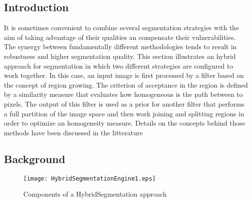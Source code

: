 %
%
% 
%
%
%

\subsection{Introduction}
\label{sec:HybridSegmentationIntroduction}


It is sometimes convenient to combine several segmentation strategies with the
aim of taking advantage of their qualities an compensate their vulnerabilities.
The synergy between fundamentally different methodologies tends to result in
robustness and higher segmentation quality.  This section illustrates an hybrid
approach for segmentation in which two different strategies are configured to
work together. In this case, an input image is first processed by a filter
based on the concept of region growing. The criterion of acceptance in the
region is defined by a similarity measure that evaluates how homogeneous is the
path between to pixels. The output of this filter is used as a prior for
another filter that performs a full partition of the image space and then work
joining and splitting regions in order to optimize an homogeneity measure.
Details on the concepts behind those methods have been discussed in the
litterature
\cite{Angelini2002,Udupa2002,Jin2002,Imielinska2001,Imielinska2000a,Imielinska2000b}



\subsection{Background}
\label{sec:HybridSegmentationBackground}




%
%
%

\begin{figure}
\center
\texttt{[image: HybridSegmentationEngine1.eps]}
\caption{Components of a HybridSegmentation approach}
\label{fig:HybridSegmentationEngine1}
\end{figure}

